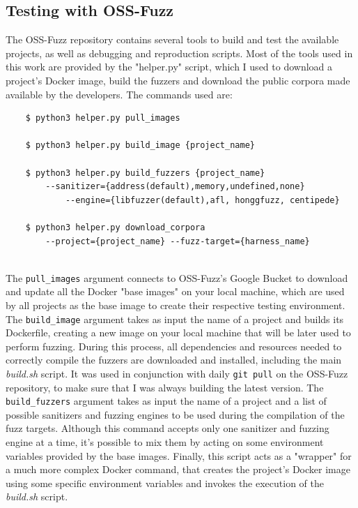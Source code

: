 \subsection{Testing with OSS-Fuzz}
The OSS-Fuzz repository contains several tools to build and test the available projects, as well as debugging and reproduction scripts.
\newline
Most of the tools used in this work are provided by the "helper.py" script, which I used to download a project's Docker image, build the fuzzers and download the public corpora made available by the developers.
\newline \newline
The commands used are:
\begin{verbatim}
    $ python3 helper.py pull_images 

    $ python3 helper.py build_image {project_name}

    $ python3 helper.py build_fuzzers {project_name}
        --sanitizer={address(default),memory,undefined,none} 
            --engine={libfuzzer(default),afl, honggfuzz, centipede}
        
    $ python3 helper.py download_corpora 
        --project={project_name} --fuzz-target={harness_name}
\end{verbatim}
\ \\
The \verb|pull_images| argument connects to OSS-Fuzz's Google Bucket to download and update all the Docker "base images" on your local machine, which are used by all projects as the base image to create their respective testing environment.
\newline \newline
The \verb|build_image| argument takes as input the name of a project and builds its Dockerfile, creating a new image on your local machine that will be later used to perform fuzzing. During this process, all dependencies and resources needed to correctly compile the fuzzers are downloaded and installed, including the main \textit{build.sh} script. It was used in conjunction with daily \verb|git pull| on the OSS-Fuzz repository, to make sure that I was always building the latest version. 
\newline \newline
The \verb|build_fuzzers| argument takes as input the name of a project and a list of possible sanitizers and fuzzing engines to be used during the compilation of the fuzz targets. Although this command accepts only one sanitizer and fuzzing engine at a time, it's possible to mix them by acting on some environment variables provided by the base images. Finally, this script acts as a "wrapper" for a much more complex Docker command, that creates the project's Docker image using some specific environment variables and invokes the execution of the \textit{build.sh} script.

